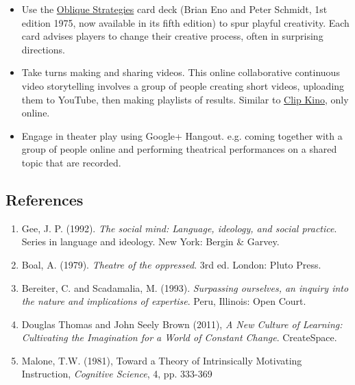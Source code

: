 \begin{itemize}
\item
  Use the \href{http://www.rtqe.net/ObliqueStrategies/}{Oblique
  Strategies} card deck (Brian Eno and Peter Schmidt, 1st edition 1975,
  now available in its fifth edition) to spur playful creativity. Each
  card advises players to change their creative process, often in
  surprising directions.
\item
  Take turns making and sharing videos. This online collaborative
  continuous video storytelling involves a group of people creating
  short videos, uploading them to YouTube, then making playlists of
  results. Similar to \href{http://clipkino.info/}{Clip Kino}, only
  online.
\item
  Engage in theater play using Google+ Hangout. e.g. coming together
  with a group of people online and performing theatrical performances
  on a shared topic that are recorded.
\end{itemize}
\subsection{References}

\begin{enumerate}
\item
  Gee, J. P. (1992). \emph{The social mind: Language, ideology, and
  social practice}. Series in language and ideology. New York: Bergin \&
  Garvey.
\item
  Boal, A. (1979). \emph{Theatre of the oppressed}. 3rd ed. London:
  Pluto Press.
\item
  Bereiter, C. and Scadamalia, M. (1993). \emph{Surpassing ourselves, an
  inquiry into the nature and implications of expertise}. Peru,
  Illinois: Open Court.
\item
  Douglas Thomas and John Seely Brown (2011), \emph{A New Culture of
  Learning: Cultivating the Imagination for a World of Constant Change}.
  CreateSpace.
\item
  Malone, T.W. (1981), Toward a Theory of Intrinsically Motivating
  Instruction, \emph{Cognitive Science}, 4, pp. 333-369
\end{enumerate}
